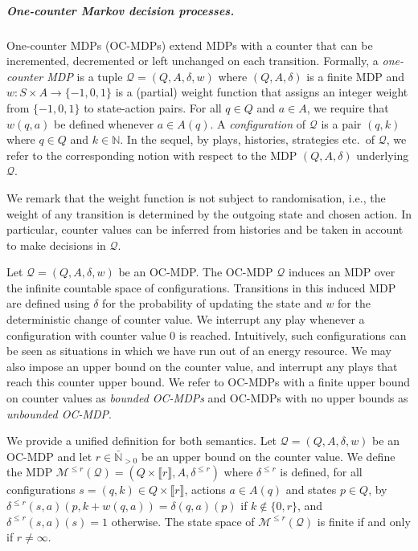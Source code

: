 \documentclass[a4paper,UKenglish,cleveref,autoref,thm-restate,colorlinks]{lipics-v2021}
\newcommand{\integerInterval}[1]{\llbracket{}#1\rrbracket{}}
\newcommand{\IN}{\mathbb{N}}
\newcommand{\INposBar}{\bar{\IN}_{>0}}
\newcommand{\mdp}{\mathcal{M}}
\newcommand{\mdpStateSpace}{S}
\newcommand{\mdpActionSpace}{A}
\newcommand{\weight}{w}
\newcommand{\ocmdp}{\mathcal{Q}}
\newcommand{\ocmdpFin}[2]{\mdp^{\leq #2}(#1)}
\newcommand{\ocStateSpace}{Q}
\newcommand{\ocState}{q}
\newcommand{\ocStateB}{p}
\newcommand{\ocCount}{k}
\newcommand{\ocConfig}{s}
\newcommand{\ocConfigPair}{(\ocState, \ocCount)}
\newcommand{\ocActionSpace}{A}
\newcommand{\ocAction}{a}
\newcommand{\ocTrans}{\delta}
\newcommand{\ocTransFin}{\delta^{\leq \counterUB}}
\newcommand{\ocTuple}{(\ocStateSpace, \ocActionSpace, \ocTrans, \weight)}
\newcommand{\ocTupleWeightless}{(\ocStateSpace, \ocActionSpace, \ocTrans)}
\newcommand{\counterUB}{r}
\begin{document}
\subparagraph*{One-counter Markov decision processes.}
One-counter MDPs (OC-MDPs) extend MDPs with a counter that can be incremented, decremented or left unchanged on each transition.
Formally, a \textit{one-counter MDP} is a tuple $\ocmdp = \ocTuple$ where $\ocTupleWeightless$ is a finite MDP and $\weight\colon \mdpStateSpace\times\mdpActionSpace\to \{-1, 0, 1\}$ is a (partial) weight function that assigns an integer weight from \(\{-1,0,1 \} \) to state-action pairs.
For all $\ocState\in\ocStateSpace$ and $\ocAction\in\ocActionSpace$, we require that $\weight(\ocState, \ocAction)$ be defined whenever $\ocAction\in\ocActionSpace(\ocState)$.
A \textit{configuration} of $\ocmdp$ is a pair $\ocConfigPair$ where $\ocState\in\ocStateSpace$ and $\ocCount\in\IN$.
In the sequel, by plays, histories, strategies etc.~of $\ocmdp$, we refer to the corresponding notion with respect to the MDP $\ocTupleWeightless$ underlying $\ocmdp$.

We remark that the weight function is not subject to randomisation, i.e., the weight of any transition is determined by the outgoing state and chosen action.
In particular, counter values can be inferred from histories and be taken in account to make decisions in $\ocmdp$.

Let $\ocmdp = \ocTuple$ be an OC-MDP.
The OC-MDP $\ocmdp$ induces an MDP over the infinite countable space of configurations.
Transitions in this induced MDP are defined using $\ocTrans$ for the probability of updating the state and $\weight$ for the deterministic change of counter value.
We interrupt any play whenever a configuration with counter value $0$ is reached.
Intuitively, such configurations can be seen as situations in which we have run out of an energy resource.
We may also impose an upper bound on the counter value, and interrupt any plays that reach this counter upper bound. We refer to OC-MDPs with a finite upper bound on counter values as \textit{bounded OC-MDPs} and OC-MDPs with no upper bounds as \textit{unbounded OC-MDP}.

We provide a unified definition for both semantics.
Let $\ocmdp = \ocTuple$ be an OC-MDP and let $\counterUB\in\INposBar$ be an upper bound on the counter value.
We define the MDP $\ocmdpFin{\ocmdp}{\counterUB} = (\ocStateSpace \times \integerInterval{\counterUB}, \ocActionSpace, \ocTransFin)$ where $\ocTransFin$ is defined, for all configurations $\ocConfig = \ocConfigPair\in\ocStateSpace\times\integerInterval{\counterUB}$, actions $\ocAction\in\ocActionSpace(\ocState)$ and states $\ocStateB\in\ocStateSpace$, by $\ocTransFin(\ocConfig, \ocAction)(\ocStateB, \ocCount + \weight(\ocState, \ocAction)) = \ocTrans(\ocState, \ocAction)(\ocStateB)$ if $\ocCount\notin\{0, \counterUB\}$, and $\ocTransFin(\ocConfig, \ocAction)(\ocConfig) = 1$ otherwise.
The state space of $\ocmdpFin{\ocmdp}{\counterUB}$ is finite if and only if $\counterUB\neq\infty$.
\end{document}
